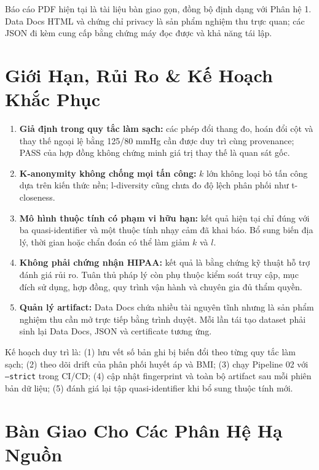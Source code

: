 \documentclass[11pt,a4paper]{article}
\begin{document}
Báo cáo PDF hiện tại là tài liệu bàn giao gọn, đồng bộ định dạng với Phân hệ 1. Data Docs HTML và chứng chỉ privacy là sản phẩm nghiệm thu trực quan; các JSON đi kèm cung cấp bằng chứng máy đọc được và khả năng tái lập.

\section{Giới Hạn, Rủi Ro \& Kế Hoạch Khắc Phục}

\begin{enumerate}
    \item \textbf{Giả định trong quy tắc làm sạch:} các phép đổi thang đo, hoán đổi cột và thay thế ngoại lệ bằng 125/80 mmHg cần được duy trì cùng provenance; PASS của hợp đồng không chứng minh giá trị thay thế là quan sát gốc.
    \item \textbf{K-anonymity không chống mọi tấn công:} $k$ lớn không loại bỏ tấn công dựa trên kiến thức nền; l-diversity cũng chưa đo độ lệch phân phối như t-closeness.
    \item \textbf{Mô hình thuộc tính có phạm vi hữu hạn:} kết quả hiện tại chỉ đúng với ba quasi-identifier và một thuộc tính nhạy cảm đã khai báo. Bổ sung biến địa lý, thời gian hoặc chẩn đoán có thể làm giảm $k$ và $l$.
    \item \textbf{Không phải chứng nhận HIPAA:} kết quả là bằng chứng kỹ thuật hỗ trợ đánh giá rủi ro. Tuân thủ pháp lý còn phụ thuộc kiểm soát truy cập, mục đích sử dụng, hợp đồng, quy trình vận hành và chuyên gia đủ thẩm quyền.
    \item \textbf{Quản lý artifact:} Data Docs chứa nhiều tài nguyên tĩnh nhưng là sản phẩm nghiệm thu cần mở trực tiếp bằng trình duyệt. Mỗi lần tái tạo dataset phải sinh lại Data Docs, JSON và certificate tương ứng.
\end{enumerate}

Kế hoạch duy trì là: (1) lưu vết số bản ghi bị biến đổi theo từng quy tắc làm sạch; (2) theo dõi drift của phân phối huyết áp và BMI; (3) chạy Pipeline 02 với \texttt{--strict} trong CI/CD; (4) cập nhật fingerprint và toàn bộ artifact sau mỗi phiên bản dữ liệu; (5) đánh giá lại tập quasi-identifier khi bổ sung thuộc tính mới.

\section{Bàn Giao Cho Các Phân Hệ Hạ Nguồn}
\end{document}
